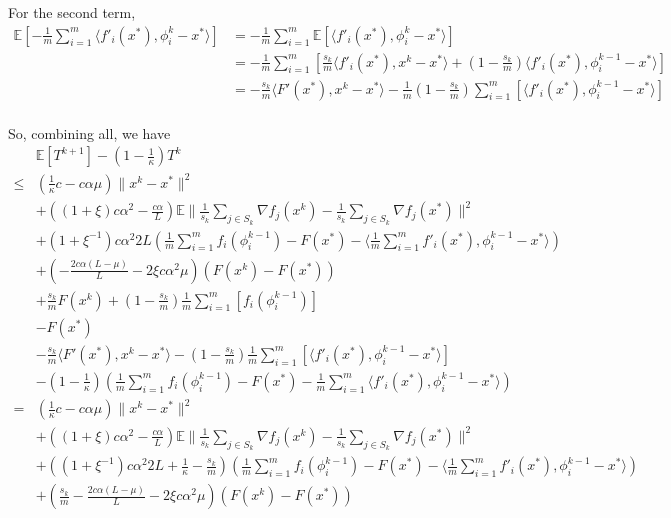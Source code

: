\documentclass[12pt]{article}
\begin{document}
		For the second term, 
		\begin{align*}
		\mathbb{E} \left[  -  \frac{1}{m}  \sum_{i =1}^{m} \langle f'_i(x^*), \phi_i^{k} - x^*\rangle \right] &= -  \frac{1}{m}  \sum_{i =1}^{m} \mathbb{E} \left[  \langle f'_i(x^*), \phi_i^{k} - x^*\rangle \right] \\
		&=  -\frac{1}{m}  \sum_{i =1}^{m} \left[  \frac{s_k}{m}  \langle f'_i(x^*), x^k - x^*\rangle  +  \left(1 - \frac{s_k}{m} \right )  \langle f'_i(x^*), \phi_i^{k-1} - x^*\rangle \right] \\
		&=   -\frac{s_k}{m}  \langle F'(x^*), x^k - x^*\rangle  -\frac{1}{m}\left(1 - \frac{s_k}{m} \right )   \sum_{i =1}^{m} \left[   \langle f'_i(x^*), \phi_i^{k-1} - x^*\rangle \right] \\
		\end{align*}
		
		
		So, combining all, we have 
				\begin{align*}
					&\mathbb{E}\left[ T^{k+1} \right] - \left(1-\frac{1}{\kappa} \right) T^k \\
					\leq  &( \frac{1}{\kappa}c-c \alpha \mu)\|x^k - x^* \|^2 \\
			&+ ((1+\xi)c \alpha^2 - \frac{c \alpha }{L})\mathbb{E} \| \frac{1}{s_k} \sum_{j \in S_k}   \nabla f_j(x^k) -\frac{1}{s_k} \sum_{j \in S_k}   \nabla f_j(x^*) \|^2\\
			&+(1+\xi^{-1})c \alpha^2 2L(\frac{1}{m}\sum_{i =1}^{m}  f_i(\phi_i^{k-1})   - F(x^*)  -  \langle \frac{1 }{m} \sum_{i =1}^{m}   f'_i(x^*), \phi_i^{k-1} - x^*\rangle)\\
		&+( -\frac{2c \alpha(L - \mu)}{L}- 2 \xi c \alpha^2 \mu) (F(x^k) - F(x^*))\\
		&+\frac{s_k}{m}  F(x^k) + \left(1 - \frac{s_k}{m} \right )\frac{1}{m} \sum_{i =1}^{m} \left[  f_i(\phi_i^{k-1}) \right] \\		
		&-F(x^*)\\
		& -\frac{s_k}{m}  \langle F'(x^*), x^k - x^*\rangle  -\left(1 - \frac{s_k}{m} \right ) \frac{1}{m}  \sum_{i =1}^{m} \left[   \langle f'_i(x^*), \phi_i^{k-1} - x^*\rangle \right] \\
		&-  \left(1-\frac{1}{\kappa} \right)( \frac{1}{m} \sum_{i =1}^{m} f_i(\phi_i^{k-1}) - F(x^*) - \frac{1}{m}  \sum_{i =1}^{m} \langle f'_i(x^*), \phi_i^{k-1} - x^*\rangle )	\\
		= &( \frac{1}{\kappa}c-c \alpha \mu)\|x^k - x^* \|^2 \\
			&+ ((1+\xi)c \alpha^2 - \frac{c \alpha }{L})\mathbb{E} \| \frac{1}{s_k} \sum_{j \in S_k}   \nabla f_j(x^k) -\frac{1}{s_k} \sum_{j \in S_k}   \nabla f_j(x^*) \|^2\\
			&+((1+\xi^{-1})c \alpha^2 2L+\frac{1}{\kappa}- \frac{s_k}{m})(\frac{1}{m}\sum_{i =1}^{m}  f_i(\phi_i^{k-1})   - F(x^*)  -  \langle \frac{1 }{m} \sum_{i =1}^{m}   f'_i(x^*), \phi_i^{k-1} - x^*\rangle)\\
		&+(\frac{s_k}{m} -\frac{2c \alpha(L - \mu)}{L}- 2 \xi c \alpha^2 \mu) (F(x^k) - F(x^*))\\
	\end{align*}
		
\end{document}
